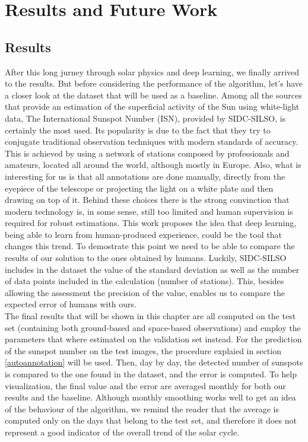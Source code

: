 \chapter{Results and Future Work}
\label{capitolo8}
\thispagestyle{empty}
\section{Results}
After this long jurney through solar physics and deep learning, we finally arrived to the results. But before considering the performance of the algorithm, let's have a closer look at the dataset that will be used as a baseline. Among all the sources that provide an estimation of the superficial activity of the Sun using white-light data, The International Sunspot Number (ISN), provided by SIDC-SILSO, is certainly the most used. Its popularity is due to the fact that they try to conjugate traditional observation techniques with modern standards of accuracy. This is achieved by using a network of stations composed by professionals and amateurs, located all around the world, although mostly in Europe. Also, what is interesting for us is that all annotations are done manually, directly from the eyepiece of the telescope or projecting the light on a white plate and then drawing on top of it. Behind these choices there is the strong convinction that modern technology is, in some sense, still too limited and human supervision is required for robust estimations. This work proposes the idea that deep learning, being able to learn from human-produced experience, could be the tool that changes this trend. To demostrate this point we need to be able to compare the results of our solution to the ones obtained by humans. Luckily, SIDC-SILSO includes in the dataset the value of the standard deviation as well as the number of data points included in the calculation (number of stations). This, besides allowing the assessment the precision of the value, enables us to compare the expected error of humans with ours.\\
The final results that will be shown in this chapter are all computed on the test set (containing both ground-based and space-based observations) and employ the parameters that where estimated on the validation set instead. For the prediction of the sunspot number on the test images, the procedure explaied in section \ref{autoannotation} will be used. Then, day by day, the detected number of sunspots is compared to the one found in the dataset, and the error is computed. To help visualization, the final value and the error are averaged monthly for both our results and the baseline. Although monthly smoothing works well to get an idea of the behaviour of the algorithm, we remind the reader that the average is computed only on the days that belong to the test set, and therefore it does not represent a good indicator of the overall trend of the solar cycle.\\
